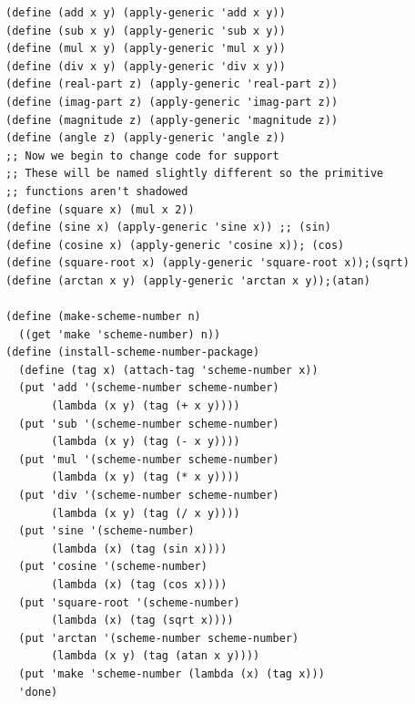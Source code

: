 \documentclass[final,fleqn,titlepage,twoside]{article}
\begin{document}
\begin{verbatim}
(define (add x y) (apply-generic 'add x y))
(define (sub x y) (apply-generic 'sub x y))
(define (mul x y) (apply-generic 'mul x y))
(define (div x y) (apply-generic 'div x y))
(define (real-part z) (apply-generic 'real-part z))
(define (imag-part z) (apply-generic 'imag-part z))
(define (magnitude z) (apply-generic 'magnitude z))
(define (angle z) (apply-generic 'angle z))
;; Now we begin to change code for support
;; These will be named slightly different so the primitive
;; functions aren't shadowed
(define (square x) (mul x 2))
(define (sine x) (apply-generic 'sine x)) ;; (sin)
(define (cosine x) (apply-generic 'cosine x)); (cos)
(define (square-root x) (apply-generic 'square-root x));(sqrt)
(define (arctan x y) (apply-generic 'arctan x y));(atan)

(define (make-scheme-number n)
  ((get 'make 'scheme-number) n))
(define (install-scheme-number-package)
  (define (tag x) (attach-tag 'scheme-number x))
  (put 'add '(scheme-number scheme-number)
       (lambda (x y) (tag (+ x y))))
  (put 'sub '(scheme-number scheme-number)
       (lambda (x y) (tag (- x y))))
  (put 'mul '(scheme-number scheme-number)
       (lambda (x y) (tag (* x y))))
  (put 'div '(scheme-number scheme-number)
       (lambda (x y) (tag (/ x y))))
  (put 'sine '(scheme-number)
       (lambda (x) (tag (sin x))))
  (put 'cosine '(scheme-number)
       (lambda (x) (tag (cos x))))
  (put 'square-root '(scheme-number)
       (lambda (x) (tag (sqrt x))))
  (put 'arctan '(scheme-number scheme-number)
       (lambda (x y) (tag (atan x y))))
  (put 'make 'scheme-number (lambda (x) (tag x)))
  'done)


\end{verbatim}
\end{document}
